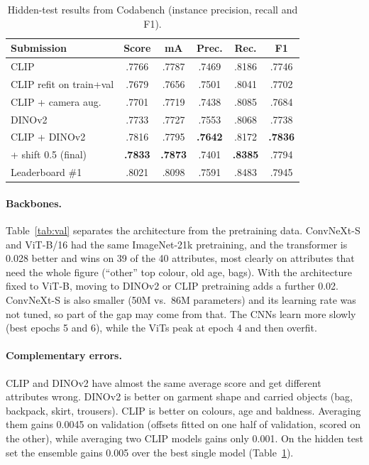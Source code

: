 \documentclass[10pt,twocolumn,letterpaper]{article}
\begin{document}
\begin{table}[t]
\centering
\small
\setlength{\tabcolsep}{3pt}
\begin{tabular}{lccccc}
\toprule
Submission & Score & mA & Prec. & Rec. & F1 \\
\midrule
CLIP & .7766 & .7787 & .7469 & .8186 & .7746 \\
CLIP refit on train+val & .7679 & .7656 & .7501 & .8041 & .7702 \\
CLIP + camera aug. & .7701 & .7719 & .7438 & .8085 & .7684 \\
DINOv2 & .7733 & .7727 & .7553 & .8068 & .7738 \\
CLIP + DINOv2 & .7816 & .7795 & \textbf{.7642} & .8172 & \textbf{.7836} \\
\quad + shift 0.5 (final) & \textbf{.7833} & \textbf{.7873} & .7401 & \textbf{.8385} & .7794 \\
\midrule
Leaderboard \#1 & .8021 & .8098 & .7591 & .8483 & .7945 \\
\bottomrule
\end{tabular}
\caption{Hidden-test results from Codabench (instance precision, recall and F1).}
\label{tab:test}
\end{table}

\paragraph{Backbones.} Table~\ref{tab:val} separates the architecture from the pretraining data. ConvNeXt-S and ViT-B/16 had the same ImageNet-21k pretraining, and the transformer is 0.028 better and wins on 39 of the 40 attributes, most clearly on attributes that need the whole figure (``other'' top colour, old age, bags). With the architecture fixed to ViT-B, moving to DINOv2 or CLIP pretraining adds a further 0.02. ConvNeXt-S is also smaller (50M vs.\ 86M parameters) and its learning rate was not tuned, so part of the gap may come from that. The CNNs learn more slowly (best epochs 5 and 6), while the ViTs peak at epoch 4 and then overfit.

\paragraph{Complementary errors.} CLIP and DINOv2 have almost the same average score and get different attributes wrong. DINOv2 is better on garment shape and carried objects (bag, backpack, skirt, trousers). CLIP is better on colours, age and baldness. Averaging them gains 0.0045 on validation (offsets fitted on one half of validation, scored on the other), while averaging two CLIP models gains only 0.001. On the hidden test set the ensemble gains 0.005 over the best single model (Table~\ref{tab:test}).
\end{document}

